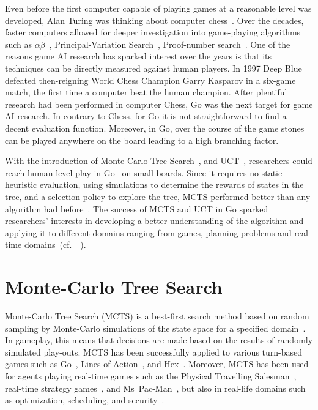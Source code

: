 \documentclass{kecsmstr}
\newcommand{\cf}{{cf.}~}
\begin{document}
Even before the first computer capable of playing games at a reasonable level was developed, Alan Turing was thinking about computer chess~. Over the decades, faster computers allowed for deeper investigation into game-playing algorithms such as $\alpha\beta$~, Principal-Variation Search~, Proof-number search~. One of the reasons game AI research has sparked interest over the years is that its techniques can be directly measured against human players. In 1997 {\sc Deep Blue}~ defeated then-reigning World Chess Champion Garry Kasparov in a six-game match, the first time a computer beat the human champion. After plentiful research had been performed in computer Chess, Go was the next target for game AI research. In contrary to Chess, for Go it is not straightforward to find a decent evaluation function. Moreover, in Go, over the course of the game stones can be played anywhere on the board leading to a high branching factor.

With the introduction of Monte-Carlo Tree Search~, and UCT~, researchers could reach human-level play in Go~ on small boards. Since it requires no static heuristic evaluation, using simulations to determine the rewards of states in the tree, and a selection policy to explore the tree, MCTS performed better than any algorithm had before~. The success of MCTS and UCT in Go sparked researchers' interests in developing a better understanding of the algorithm and applying it to different domains ranging from games, planning problems and real-time domains~(\cf~).
\newpage
\section{Monte-Carlo Tree Search}
Monte-Carlo Tree Search (MCTS) is a best-first search method based on random sampling by Monte-Carlo simulations of the state space for a specified domain~. In gameplay, this means that decisions are made based on the results of randomly simulated play-outs. MCTS has been successfully applied to various turn-based games such as Go~, Lines of Action~, and Hex~. Moreover, MCTS has been used for agents playing real-time games such as the Physical Travelling Salesman~, real-time strategy games~, and Ms~Pac-Man~, but also in real-life domains such as optimization, scheduling, and security~.
\end{document}

